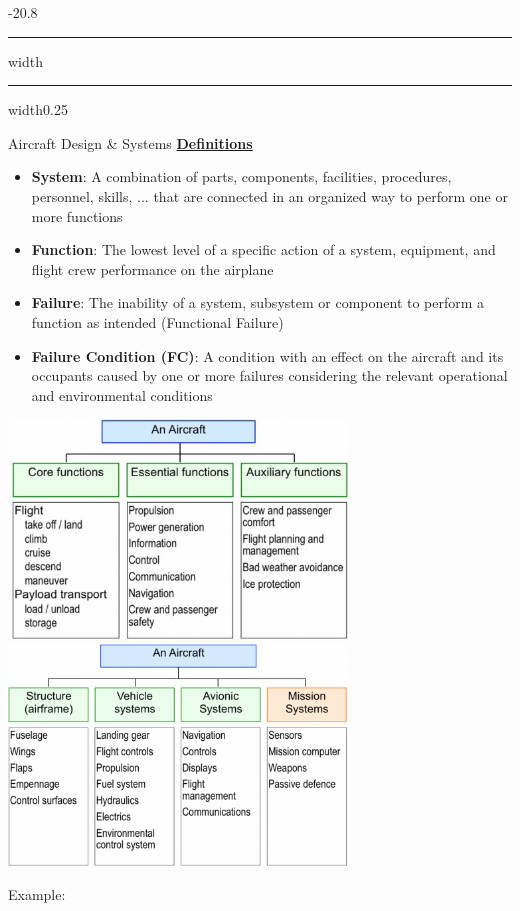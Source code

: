 \documentclass[9pt, landscape, fleqn]{scrartcl}
\makeatletter
\renewcommand{\section}{\@startsection{section}{1}{0mm}%
{-2\baselineskip}{0.8\baselineskip}%
{\hrule depth 0.2pt width\columnwidth\hrule depth1.5pt
width0.25\columnwidth\vspace*{1.2em}\Large\bfseries\rmfamily}}
\makeatother
\begin{document}
\begin{multicols*}{3}
\section{Aircraft Design \& Systems}
\underline{\textbf{Definitions}}
\begin{itemize}
    \item \textbf{System}: A combination of parts, components, facilities, procedures, personnel, skills, ... that are connected in an organized way to perform one or more functions
    \item \textbf{Function}: The lowest level of a specific action of a system, equipment, and flight crew performance on the airplane
    \item \textbf{Failure}: The inability of a system, subsystem or component to perform a function as intended (Functional Failure)
    \item \textbf{Failure Condition (FC)}: A condition with an effect on the aircraft and its occupants caused by one or more failures considering the relevant operational and environmental conditions
\end{itemize}
\begin{center}
    \includegraphics[width=9cm]{Images/Systemisation-Aircraft-Function.png}
    \includegraphics[width=9cm]{Images/Systemisation-Aircraft-System.png}
\end{center}
Example:
\begin{itemize}

\end{itemize}
\end{multicols*}
\end{document}
